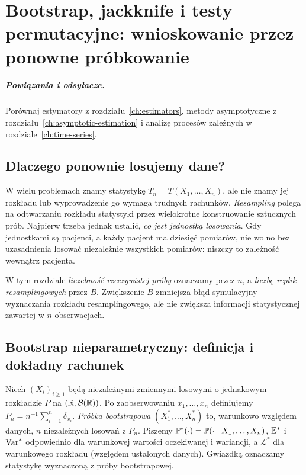\chapter{Bootstrap, jackknife i testy permutacyjne: wnioskowanie przez ponowne próbkowanie}
\label{ch:resampling}
\paragraph{Powiązania i odsyłacze.} Porównaj estymatory z rozdziału~\ref{ch:estimators}, metody asymptotyczne z rozdziału~\ref{ch:asymptotic-estimation} i analizę procesów zależnych w rozdziale~\ref{ch:time-series}.


\section{Dlaczego ponownie losujemy dane?}
W wielu problemach znamy statystykę $T_n=T(X_1,\ldots,X_n)$,
ale nie znamy jej rozkładu lub wyprowadzenie go wymaga trudnych
rachunków. \emph{Resampling} polega na odtwarzaniu rozkładu
statystyki przez wielokrotne konstruowanie sztucznych prób.
Najpierw trzeba jednak ustalić, \emph{co jest jednostką losowania}.
Gdy jednostkami są pacjenci, a każdy pacjent ma dziesięć pomiarów,
nie wolno bez uzasadnienia losować niezależnie wszystkich pomiarów:
niszczy to zależność wewnątrz pacjenta.

W tym rozdziale \emph{liczebność rzeczywistej próby} oznaczamy przez $n$,
a \emph{liczbę replik resamplingowych} przez $B$. Zwiększenie $B$
zmniejsza błąd symulacyjny wyznaczania rozkładu resamplingowego,
ale nie zwiększa informacji statystycznej zawartej w $n$ obserwacjach.

\section{Bootstrap nieparametryczny: definicja i dokładny rachunek}
\begin{definicja}
\label{def:bootstrap-sample}
Niech $(X_i)_{i\ge1}$ będą niezależnymi zmiennymi losowymi
o jednakowym rozkładzie $P$ na $(\mathbb R,\mathcal B(\mathbb R))$.
Po zaobserwowaniu $x_1,\ldots,x_n$ definiujemy
$P_n=n^{-1}\sum_{i=1}^n\delta_{x_i}$.
\emph{Próbka bootstrapowa} $(X_1^*,\ldots,X_n^*)$ to,
warunkowo względem danych, $n$ niezależnych losowań z $P_n$.
Piszemy $\mathbb P^*(\cdot)=\mathbb P(\cdot\mid X_1,\ldots,X_n)$,
$\mathbb E^*$ i $\operatorname{Var}^*$ odpowiednio dla warunkowej wartości
oczekiwanej i wariancji, a $\mathcal L^*$ dla warunkowego
rozkładu (względem ustalonych danych). Gwiazdką oznaczamy statystykę
wyznaczoną z próby bootstrapowej.
\end{definicja}

